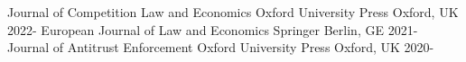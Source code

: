 


\begin{cvhonors}

  \cvhonor
    {Journal of Competition Law and Economics} %
    {Oxford University Press} %
    {Oxford, UK} %
    {2022-} %
  \cvhonor
    {European Journal of Law and Economics} %
    {Springer} %
    {Berlin, GE} %
    {2021-} %
  \cvhonor
    {Journal of Antitrust Enforcement} %
    {Oxford University Press} %
    {Oxford, UK} %
    {2020-} %

\end{cvhonors}